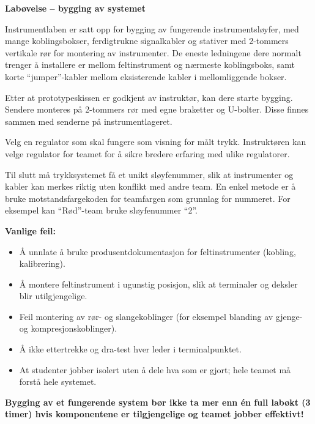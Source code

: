 \noindent
{\bf Labøvelse -- bygging av systemet}

\vskip 5pt

Instrumentlaben er satt opp for bygging av fungerende instrumentsløyfer, med mange koblingsbokser, ferdigtrukne signalkabler og stativer med 2-tommers vertikale rør for montering av instrumenter. De eneste ledningene dere normalt trenger å installere er mellom feltinstrument og nærmeste koblingsboks, samt korte ``jumper''-kabler mellom eksisterende kabler i mellomliggende bokser.

Etter at prototypeskissen er godkjent av instruktør, kan dere starte bygging. Sendere monteres på 2-tommers rør med egne braketter og U-bolter. Disse finnes sammen med senderne på instrumentlageret.

Velg en regulator som skal fungere som visning for målt trykk. Instruktøren kan velge regulator for teamet for å sikre bredere erfaring med ulike regulatorer.

Til slutt må trykksystemet få et unikt sløyfenummer, slik at instrumenter og kabler kan merkes riktig uten konflikt med andre team. En enkel metode er å bruke motstandsfargekoden for teamfargen som grunnlag for nummeret. For eksempel kan ``Rød''-team bruke sløyfenummer ``2''.

\vskip 10pt

{\bf Vanlige feil:}

\begin{itemize}
\item{} Å unnlate å bruke produsentdokumentasjon for feltinstrumenter (kobling, kalibrering).
\item{} Å montere feltinstrument i ugunstig posisjon, slik at terminaler og deksler blir utilgjengelige.
\item{} Feil montering av rør- og slangekoblinger (for eksempel blanding av gjenge- og kompresjonskoblinger).
\item{} Å ikke ettertrekke og dra-test hver leder i terminalpunktet.
\item{} At studenter jobber isolert uten å dele hva som er gjort; hele teamet må forstå hele systemet.
\end{itemize}

\vskip 10pt

{\bf Bygging av et fungerende system bør ikke ta mer enn én full labøkt (3 timer) hvis komponentene er tilgjengelige og teamet jobber effektivt!}





\vfil \eject

